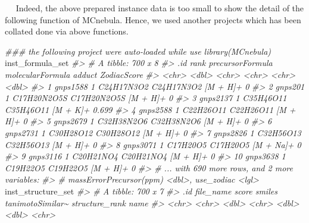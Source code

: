 \documentclass[]{tufte-handout}
\newenvironment{Shaded}{}{}
\newcommand{\CommentTok}[1]{\textcolor[rgb]{0.38,0.63,0.69}{\textit{#1}}}
\newcommand{\NormalTok}[1]{#1}
\begin{document}
   Indeed, the above prepared instance data is too small to show the
detail of the following function of MCnebula. Hence, we used another
projects which has been collated done via above functions.

\begin{Shaded}
\begin{Highlighting}[]
\CommentTok{\#\#\# the following project were auto{-}loaded while use \textquotesingle{}library(MCnebula)\textquotesingle{}}
\NormalTok{inst\_formula\_set}
\CommentTok{\#\textgreater{} \# A tibble: 700 x 8}
\CommentTok{\#\textgreater{}    .id       rank precursorFormula molecularFormula adduct    ZodiacScore}
\CommentTok{\#\textgreater{}    \textless{}chr\textgreater{}    \textless{}dbl\textgreater{} \textless{}chr\textgreater{}            \textless{}chr\textgreater{}            \textless{}chr\textgreater{}           \textless{}dbl\textgreater{}}
\CommentTok{\#\textgreater{}  1 gnps1588     1 C24H17N3O2       C24H17N3O2       [M + H]+        0    }
\CommentTok{\#\textgreater{}  2 gnps201      1 C17H20N2O5S      C17H20N2O5S      [M + H]+        0    }
\CommentTok{\#\textgreater{}  3 gnps2137     1 C35H46O11        C35H46O11        [M + K]+        0.699}
\CommentTok{\#\textgreater{}  4 gnps2588     1 C22H26O11        C22H26O11        [M + H]+        0    }
\CommentTok{\#\textgreater{}  5 gnps2679     1 C32H38N2O6       C32H38N2O6       [M + H]+        0    }
\CommentTok{\#\textgreater{}  6 gnps2731     1 C30H28O12        C30H28O12        [M + H]+        0    }
\CommentTok{\#\textgreater{}  7 gnps2826     1 C32H56O13        C32H56O13        [M + H]+        0    }
\CommentTok{\#\textgreater{}  8 gnps3071     1 C17H20O5         C17H20O5         [M + Na]+       0    }
\CommentTok{\#\textgreater{}  9 gnps3116     1 C20H21NO4        C20H21NO4        [M + H]+        0    }
\CommentTok{\#\textgreater{} 10 gnps3638     1 C19H22O5         C19H22O5         [M + H]+        0    }
\CommentTok{\#\textgreater{} \# ... with 690 more rows, and 2 more variables:}
\CommentTok{\#\textgreater{} \#   \textasciigrave{}massErrorPrecursor(ppm)\textasciigrave{} \textless{}dbl\textgreater{}, use\_zodiac \textless{}lgl\textgreater{}}
\NormalTok{inst\_structure\_set}
\CommentTok{\#\textgreater{} \# A tibble: 700 x 7}
\CommentTok{\#\textgreater{}    .id      file\_name         score smiles tanimotoSimilar\textasciitilde{} structure\_rank name }
\CommentTok{\#\textgreater{}    \textless{}chr\textgreater{}    \textless{}chr\textgreater{}             \textless{}dbl\textgreater{} \textless{}chr\textgreater{}             \textless{}dbl\textgreater{}          \textless{}dbl\textgreater{} \textless{}chr\textgreater{}}

\end{Highlighting}
\end{Shaded}
\end{document}
